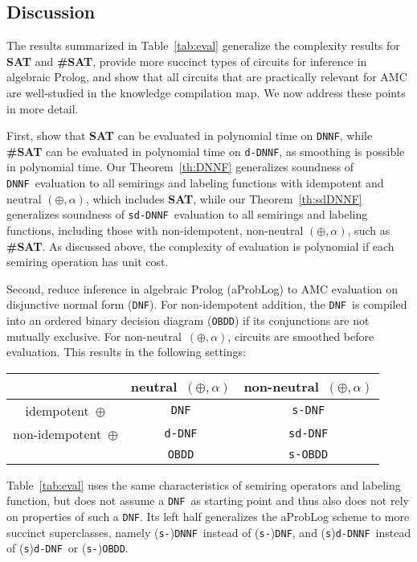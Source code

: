 \documentclass{article}
\theoremstyle{plain}
\theoremstyle{definition}
\newcommand{\DNF}{{\tt DNF}}
\newcommand{\dDNF}{{\tt d-DNF}}
\newcommand{\sDNF}{{\tt s-DNF}}
\newcommand{\sdDNF}{{\tt sd-DNF}}
\newcommand{\DNNF}{{\tt DNNF}}
\newcommand{\dDNNF}{{\tt d-DNNF}}
\newcommand{\sdDNNF}{{\tt sd-DNNF}}
\newcommand{\OBDD}{{\tt OBDD}}
\newcommand{\sOBDD}{{\tt s-OBDD}}
\begin{document}
\subsection{Discussion}\label{sec:related} 
The results summarized in Table~\ref{tab:eval} generalize the
complexity results for \textbf{SAT} and \textbf{\#SAT}, provide more succinct types of
circuits for inference in algebraic Prolog, and show
that all circuits that are practically relevant for AMC are
well-studied in the knowledge compilation map. We now address these
points in more detail.  

First, \citet{darwiche2002knowledge} show that \textbf{SAT} can be
evaluated in polynomial time on \DNNF, while \textbf{\#SAT} can be evaluated
in polynomial time on \dDNNF, as smoothing is possible in polynomial
time. 
Our Theorem~\ref{th:DNNF} generalizes
soundness of \DNNF\ evaluation to all semirings and labeling functions
with idempotent and neutral $(\oplus,\alpha)$, which includes
\textbf{SAT}, while 
our Theorem~\ref{th:sdDNNF} generalizes soundness of \sdDNNF\ evaluation
to all semirings and labeling functions, including those with non-idempotent, non-neutral $(\oplus,\alpha)$,
such as \textbf{\#SAT}. 
As discussed above, the complexity of evaluation is polynomial if each 
semiring operation has unit cost.


Second, \citet{Kimmig11} reduce 
 inference in algebraic Prolog (aProbLog) to AMC evaluation on 
disjunctive normal form
(\DNF). For non-idempotent addition, the \DNF\ is compiled into an  ordered binary decision diagram
(\OBDD) if its conjunctions are not mutually exclusive. For non-neutral~$(\oplus,\alpha)$, circuits
are smoothed before evaluation. 
This results  in the following settings:  

\begin{center}
\begin{tabular}{|c|c|c|}
\hline
& neutral~$(\oplus,\alpha)$ & non-neutral~$(\oplus,\alpha)$  \\\hline
idempotent~$\oplus$ & \DNF & \sDNF \\\hline
non-idempotent~$\oplus$ & \dDNF & \sdDNF\\
 & \OBDD & \sOBDD  \\\hline
\end{tabular}
\end{center}
Table~\ref{tab:eval} uses the same characteristics of semiring operators and labeling
function, but does not assume a \DNF\ as starting point and thus also
does not rely on properties of such a \DNF. Its left half generalizes
the aProbLog scheme to more succinct superclasses, namely (\texttt{s-})\DNNF\ instead of (\texttt{s-})\DNF,
and (\texttt{s})\dDNNF\ instead of (\texttt{s})\dDNF\ or (\texttt{s-})\OBDD.
\end{document}

